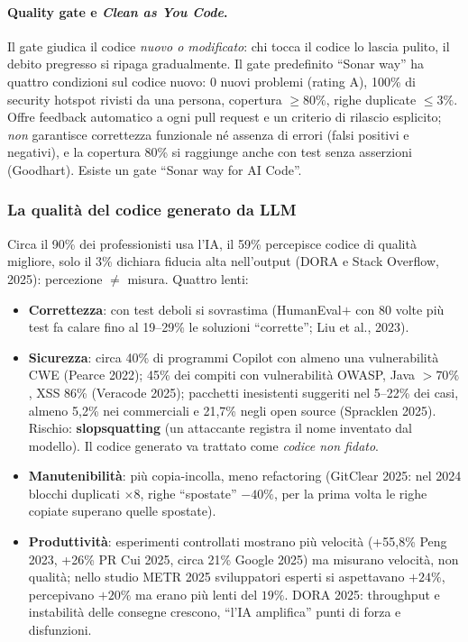 \documentclass[a4paper,12pt]{article}
\begin{document}
\paragraph{Quality gate e \emph{Clean as You Code}.} Il gate giudica il codice \emph{nuovo o
modificato}: chi tocca il codice lo lascia pulito, il debito pregresso si ripaga
gradualmente. Il gate predefinito ``Sonar way'' ha quattro condizioni sul codice nuovo: 0
nuovi problemi (rating A), 100\% di security hotspot rivisti da una persona, copertura
$\ge 80\%$, righe duplicate $\le 3\%$. Offre feedback automatico a ogni pull request e un
criterio di rilascio esplicito; \emph{non} garantisce correttezza funzionale né assenza di
errori (falsi positivi e negativi), e la copertura 80\% si raggiunge anche con test senza
asserzioni (Goodhart). Esiste un gate ``Sonar way for AI Code''.

\subsubsection{La qualità del codice generato da LLM}
Circa il 90\% dei professionisti usa l'IA, il 59\% percepisce codice di qualità migliore, solo
il 3\% dichiara fiducia alta nell'output (DORA e Stack Overflow, 2025): percezione $\neq$
misura. Quattro lenti:
\begin{itemize}
  \item \textbf{Correttezza}: con test deboli si sovrastima (HumanEval$+$ con 80 volte più
        test fa calare fino al 19--29\% le soluzioni ``corrette''; Liu et al., 2023).
  \item \textbf{Sicurezza}: circa 40\% di programmi Copilot con almeno una vulnerabilità CWE
        (Pearce 2022); 45\% dei compiti con vulnerabilità OWASP, Java $>70\%$, XSS 86\%
        (Veracode 2025); pacchetti inesistenti suggeriti nel 5--22\% dei casi, almeno 5,2\% nei
        commerciali e 21,7\% negli open source (Spracklen 2025). Rischio: \textbf{slopsquatting}
        (un attaccante registra il nome inventato dal modello). Il codice generato va
        trattato come \emph{codice non fidato}.
  \item \textbf{Manutenibilità}: più copia-incolla, meno refactoring (GitClear 2025: nel
        2024 blocchi duplicati $\times 8$, righe ``spostate'' $-40\%$, per la prima volta le
        righe copiate superano quelle spostate).
  \item \textbf{Produttività}: esperimenti controllati mostrano più velocità (+55,8\% Peng
        2023, +26\% PR Cui 2025, circa 21\% Google 2025) ma misurano velocità, non qualità; nello
        studio METR 2025 sviluppatori esperti si aspettavano $+24\%$, percepivano $+20\%$ ma
        erano più lenti del $19\%$. DORA 2025: throughput e instabilità delle consegne
        crescono, ``l'IA amplifica'' punti di forza e disfunzioni.
\end{itemize}
\end{document}
